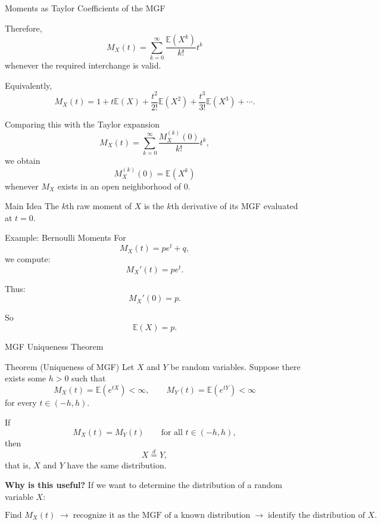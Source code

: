 \begin{frame}{Moments as Taylor Coefficients of the MGF}
 

Therefore,
\[
\boxed{
M_X(t)
=
\sum_{k=0}^{\infty}
\frac{\mathbb{E}(X^k)}{k!}t^k
}
\]
whenever the required interchange is valid.

Equivalently,
\[
M_X(t)
=
1
+t\mathbb{E}(X)
+\frac{t^2}{2!}\mathbb{E}(X^2)
+\frac{t^3}{3!}\mathbb{E}(X^3)
+\cdots.
\]

Comparing this with the Taylor expansion
\[
M_X(t)
=
\sum_{k=0}^{\infty}
\frac{M_X^{(k)}(0)}{k!}t^k,
\]
we obtain
\[
\boxed{
M_X^{(k)}(0)=\mathbb{E}(X^k)
}
\]
whenever \(M_X\) exists in an open neighborhood of \(0\).

\begin{keybox}{Main Idea}
The \(k\)th raw moment of \(X\) is the \(k\)th derivative of its MGF
evaluated at \(t=0\).
\end{keybox}

\end{frame}


















\begin{frame}{Example: Bernoulli Moments}
For
\[
M_X(t)=pe^t+q,
\]
we compute:
\[
M_X'(t)=pe^t.
\]

Thus:
\[
M_X'(0)=p.
\]

So
\[
{
\mathbb{E}(X)=p.
}
\]
\end{frame}
\begin{frame}{MGF Uniqueness Theorem}

\begin{keybox}{Theorem (Uniqueness of MGF)}
Let $X$ and $Y$ be random variables. Suppose there exists some $h>0$ such that
\[
M_X(t)=\mathbb{E}(e^{tX})<\infty,
\qquad
M_Y(t)=\mathbb{E}(e^{tY})<\infty
\]
for every $t\in(-h,h)$.

If
\[
M_X(t)=M_Y(t)
\qquad \text{for all } t\in(-h,h),
\]
then
\[
X\overset{d}{=}Y,
\]
that is, $X$ and $Y$ have the same distribution.
\end{keybox}

\vspace{0.2cm}

\textbf{Why is this useful?} If we want to determine the distribution of a random variable $X$:

\[
\boxed{
\text{Find }M_X(t)
\;\longrightarrow\;
\text{recognize it as the MGF of a known distribution}
\;\longrightarrow\;
\text{identify the distribution of }X.
}
\]
\end{frame}


